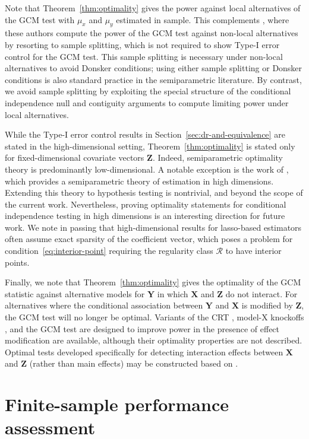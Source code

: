 \documentclass[aos]{imsart}
\theoremstyle{plain}
\theoremstyle{remark}
\newcommand{\prx}{\bm X}								%
\newcommand{\prz}{\bm Z}								%
\newcommand{\pry}{{\bm Y}}								%
\newcommand{\regclass}{\mathscr R}					    %
\begin{document}
Note that Theorem~\ref{thm:optimality} gives the power against local alternatives of the GCM test with $\mu_x$ and $\mu_y$ estimated in sample. This complements \citet[Theorem 8]{Shah2018}, where these authors compute the power of the GCM test against non-local alternatives by resorting to sample splitting, which is not required to show Type-I error control for the GCM test. This sample splitting is necessary under non-local alternatives to avoid Donsker conditions; using either sample splitting or Donsker conditions is also standard practice in the semiparametric literature. By contrast, we avoid sample splitting by exploiting the special structure of the conditional independence null and contiguity arguments to compute limiting power under local alternatives.

While the Type-I error control results in Section~\ref{sec:dr-and-equivalence} are stated in the high-dimensional setting, Theorem~\ref{thm:optimality} is stated only for fixed-dimensional covariate vectors $\prz$. Indeed, semiparametric optimality theory is predominantly low-dimensional. A notable exception is the work of \citet{Jankova2018a}, which provides a semiparametric theory of estimation in high dimensions. Extending this theory to hypothesis testing is nontrivial, and beyond the scope of the current work. Nevertheless, proving optimality statements for conditional independence testing in high dimensions is an interesting direction for future work. We note in passing that high-dimensional results for lasso-based estimators often assume exact sparsity of the coefficient vector, which poses a problem for condition~\eqref{eq:interior-point} requiring the regularity class $\regclass$ to have interior points.

Finally, we note that Theorem~\ref{thm:optimality} gives the optimality of the GCM statistic against alternative models for $\pry$ in which $\prx$ and $\prz$ do not interact. For alternatives where the conditional association between $\pry$ and $\prx$ is modified by $\prz$,  the GCM test will no longer be optimal. Variants of the CRT \citep{Zhong2021, Sesia2022}, model-X knockoffs \citep{Li2021b}, and the GCM test \citep{Lundborg2022} are designed to improve power in the presence of effect modification are available, although their optimality properties are not described. Optimal tests developed specifically for detecting interaction effects between $\bm X$ and $\bm Z$ (rather than main effects) may be constructed based on \citet{Vansteelandt2008}.

\section{Finite-sample performance assessment} \label{sec:simulations}
	
\end{document}

